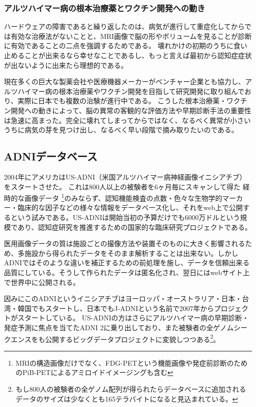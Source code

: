 \subsubsection{アルツハイマー病の根本治療薬とワクチン開発への動き}
ハードウェアの障害であると繰り返したのは、病気が進行して重症化してからでは有効な治療法がないことと、MRI画像で脳の形やボリュームを見ることが診断に有効であることの二点を強調するためである。
壊れかけの初期のうちに食い止めることが出来るなら幸せなことであるし、もっと言えば最初から認知症症状が出ないように出来たら理想的である。

現在多くの巨大な製薬会社や医療機器メーカーがベンチャー企業とも協力し、アルツハイマー病の根本治療薬やワクチン開発を目指して研究開発に取り組んでおり、実際に日本でも複数の治験が進行中である。
こうした根本治療薬・ワクチン開発への動きによって、脳の異常の客観的な評価方法や早期診断手法の重要性は急速に高まった。完全に壊れてしまってからではなく、なるべく異常が小さいうちに病気の芽を見つけ出し、なるべく早い段階で摘み取りたいのである。
\subsection{ADNIデータベース}
2004年にアメリカはUS-ADNI（米国アルツハイマー病神経画像イニシアチブ）をスタートさせた。
これは800人以上の被験者を6ヶ月毎にスキャンして得た
経時的な画像データ
\footnote{
MRIの構造画像だけでなく、FDG-PETという機能画像や発症前診断のためのPiB-PETによるアミロイドイメージングも含む}のみならず、認知機能検査の点数・色々な生物学的マーカー・臨床的な因子などの様々な情報をデータベース化し、それをweb上で公開するという試みである。US-ADNIは開始当初の予算だけでも6000万ドルという規模であり、認知症研究を推進するための国家的な臨床研究プロジェクトである。

医用画像データの質は施設ごとの撮像方法や装置そのものに大きく影響されるため、多施設から得られたデータをそのまま解析することは出来ない。しかしADNIではそのような違いを補正するための前処理を施し、データを信頼出来る品質にしている。そうして作られたデータは匿名化され、翌日にはwebサイト上で世界中に公開される。

因みにこのADNIというイニシアチブはヨーロッパ・オーストラリア・日本・台湾・韓国でもスタートし、日本でもJ-ADNIという名前で2007年からプロジェクトがスタートしている。
US-ADNIの方はさらにアルツハイマー病の早期診断・発症予測に焦点を当てたADNI 2に乗り出しており、また被験者の全ゲノムシークエンスをも公開するビッグデータプロジェクトに変貌しつつある\footnote{もし800人の被験者の全ゲノム配列が得られたらデータベースに追加されるデータのサイズは少なくとも165テラバイトになると見込まれている。}。

